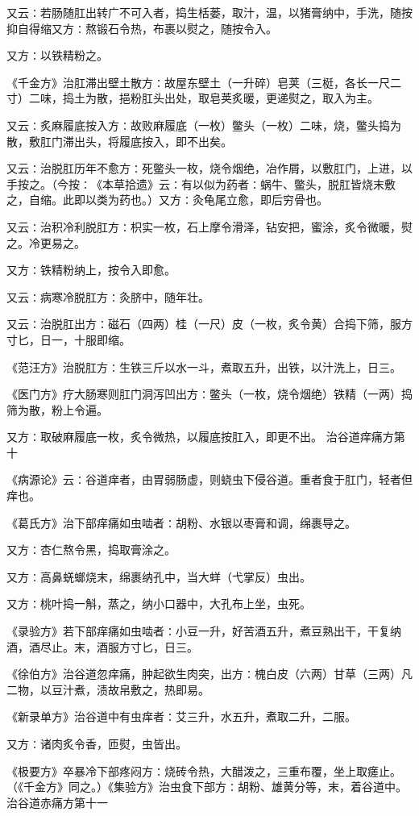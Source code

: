 \documentclass[a4paper,12pt,UTF8,twoside]{ctexbook}
\begin{document}
又云∶若肠随肛出转广不可入者，捣生栝蒌，取汁，温，以猪膏纳中，手洗，随按抑自得缩又方∶熬锻石令热，布裹以熨之，随按令入。

又方∶以铁精粉之。

《千金方》治肛滞出壁土散方∶故屋东壁土（一升碎）皂荚（三梃，各长一尺二寸）二味，捣土为散，挹粉肛头出处，取皂荚炙暖，更递熨之，取入为主。

又云∶炙麻履底按入方∶故败麻履底（一枚）鳖头（一枚）二味，烧，鳖头捣为散，敷肛门滞出头，将履底按入，即不出矣。

又云∶治脱肛历年不愈方∶死鳖头一枚，烧令烟绝，冶作屑，以敷肛门，上进，以手按之。（今按∶《本草拾遗》云∶有以似为药者∶蜗牛、鳖头，脱肛皆烧末敷之，自缩。此即以类为药也。）又方∶灸龟尾立愈，即后穷骨也。

又云∶治积冷利脱肛方∶枳实一枚，石上摩令滑泽，钻安把，蜜涂，炙令微暖，熨之。冷更易之。

又方∶铁精粉纳上，按令入即愈。

又云∶病寒冷脱肛方∶灸脐中，随年壮。

又云∶治脱肛出方∶磁石（四两）桂（一尺）皮（一枚，炙令黄）合捣下筛，服方寸匕，日一，十服即缩。

《范汪方》治脱肛方∶生铁三斤以水一斗，煮取五升，出铁，以汁洗上，日三。

《医门方》疗大肠寒则肛门洞泻凹出方∶鳖头（一枚，烧令烟绝）铁精（一两）捣筛为散，粉上令遍。

又方∶取破麻履底一枚，炙令微热，以履底按肛入，即更不出。
治谷道痒痛方第十

《病源论》云∶谷道痒者，由胃弱肠虚，则蛲虫下侵谷道。重者食于肛门，轻者但痒也。

《葛氏方》治下部痒痛如虫啮者∶胡粉、水银以枣膏和调，绵裹导之。

又方∶杏仁熬令黑，捣取膏涂之。

又方∶高鼻蜣螂烧末，绵裹纳孔中，当大蛘（弋掌反）虫出。

又方∶桃叶捣一斛，蒸之，纳小口器中，大孔布上坐，虫死。

《录验方》若下部痒痛如虫啮者∶小豆一升，好苦酒五升，煮豆熟出干，干复纳酒，酒尽止。末，酒服方寸匕，日三。

《徐伯方》治谷道忽痒痛，肿起欲生肉突，出方∶槐白皮（六两）甘草（三两）凡二物，以豆汁煮，渍故帛敷之，热即易。

《新录单方》治谷道中有虫痒者∶艾三升，水五升，煮取二升，二服。

又方∶诸肉炙令香，匝熨，虫皆出。

《极要方》卒暴冷下部疼闷方∶烧砖令热，大醋泼之，三重布覆，坐上取瘥止。（《千金方》同之。）《集验方》治虫食下部方∶胡粉、雄黄分等，末，着谷道中。
治谷道赤痛方第十一
\end{document}
